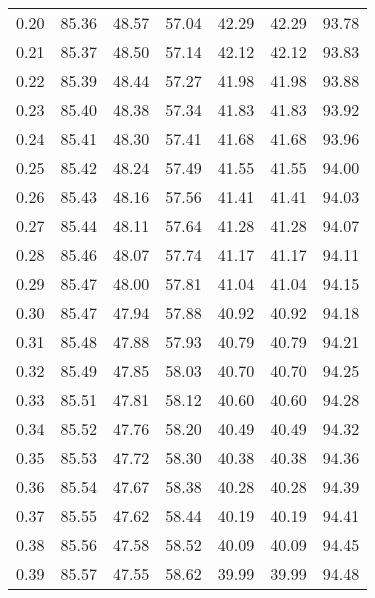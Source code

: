 \begin{tabular}{|c|c|c|c|c|c|c|}
      0.20 &     85.36 &     48.57 &      57.04 &   42.29 &      42.29 &         93.78 \\
      0.21 &     85.37 &     48.50 &      57.14 &   42.12 &      42.12 &         93.83 \\
      0.22 &     85.39 &     48.44 &      57.27 &   41.98 &      41.98 &         93.88 \\
      0.23 &     85.40 &     48.38 &      57.34 &   41.83 &      41.83 &         93.92 \\
      0.24 &     85.41 &     48.30 &      57.41 &   41.68 &      41.68 &         93.96 \\
      0.25 &     85.42 &     48.24 &      57.49 &   41.55 &      41.55 &         94.00 \\
      0.26 &     85.43 &     48.16 &      57.56 &   41.41 &      41.41 &         94.03 \\
      0.27 &     85.44 &     48.11 &      57.64 &   41.28 &      41.28 &         94.07 \\
      0.28 &     85.46 &     48.07 &      57.74 &   41.17 &      41.17 &         94.11 \\
      0.29 &     85.47 &     48.00 &      57.81 &   41.04 &      41.04 &         94.15 \\
      0.30 &     85.47 &     47.94 &      57.88 &   40.92 &      40.92 &         94.18 \\
      0.31 &     85.48 &     47.88 &      57.93 &   40.79 &      40.79 &         94.21 \\
      0.32 &     85.49 &     47.85 &      58.03 &   40.70 &      40.70 &         94.25 \\
      0.33 &     85.51 &     47.81 &      58.12 &   40.60 &      40.60 &         94.28 \\
      0.34 &     85.52 &     47.76 &      58.20 &   40.49 &      40.49 &         94.32 \\
      0.35 &     85.53 &     47.72 &      58.30 &   40.38 &      40.38 &         94.36 \\
      0.36 &     85.54 &     47.67 &      58.38 &   40.28 &      40.28 &         94.39 \\
      0.37 &     85.55 &     47.62 &      58.44 &   40.19 &      40.19 &         94.41 \\
      0.38 &     85.56 &     47.58 &      58.52 &   40.09 &      40.09 &         94.45 \\
      0.39 &     85.57 &     47.55 &      58.62 &   39.99 &      39.99 &         94.48 \\

\end{tabular}
